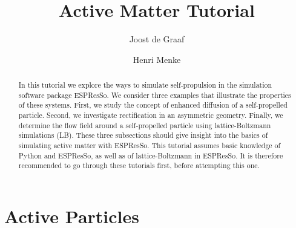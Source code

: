 \documentclass[aip,jcp,reprint,a4paper,onecolumn,amsmath]{revtex4-1}
\newcommand{\es}{\mbox{\textsf{ESPResSo}}\xspace}
\begin{document}
\title{Active Matter Tutorial}
\author{Joost de Graaf}
\author{Henri Menke}

\begin{abstract}
In this tutorial we explore the ways to simulate self-propulsion in the simulation software package \es{}. We consider three examples that illustrate the properties of these systems. First, we study the concept of enhanced diffusion of a self-propelled particle. Second, we investigate rectification in an asymmetric geometry. Finally, we determine the flow field around a self-propelled particle using lattice-Boltzmann simulations (LB). These three subsections should give insight into the basics of simulating active matter with \es{}. This tutorial assumes basic knowledge of Python and \es{}, as well as of lattice-Boltzmann in \es{}. It is therefore recommended to go through these tutorials first, before attempting this one.
\end{abstract}

\maketitle

\section{\label{sec:active}Active Particles}
\end{document}
